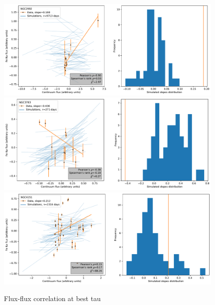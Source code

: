\begin{figure}
\begin{center}
    {
  \includegraphics[width=\textwidth]{Figs/Chapter5/Flux_corr/Flux_flux_NGC2992_besttau.pdf} \\
  \includegraphics[width=\textwidth]{Figs/Chapter5/Flux_corr/Flux_flux_NGC3783_besttau.pdf} \\
  \includegraphics[width=\textwidth]{Figs/Chapter5/Flux_corr/Flux_flux_NGC4151_besttau.pdf}  \\
  \caption{Flux-flux correlation at best tau}
    \label{fig:Flux-flux_all_4}
  }
\end{center}
\end{figure}

